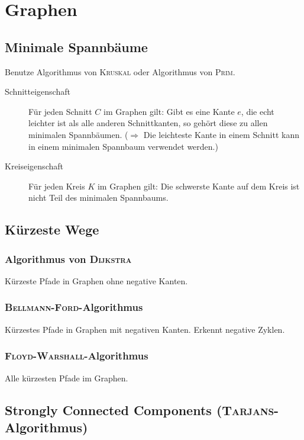 \section{Graphen}

\subsection{Minimale Spannbäume}
Benutze Algorithmus von \textsc{Kruskal} oder Algorithmus von \textsc{Prim}.
\begin{description}
	\item[Schnitteigenschaft] Für jeden Schnitt $C$ im Graphen gilt: Gibt es eine Kante $e$, die echt leichter ist als alle anderen Schnittkanten, so gehört diese zu allen minimalen Spannbäumen. ($\Rightarrow$ Die leichteste Kante in einem Schnitt kann in einem minimalen Spannbaum verwendet werden.)
	\item[Kreiseigenschaft] Für jeden Kreis $K$ im Graphen gilt: Die schwerste Kante auf dem Kreis ist nicht Teil des minimalen Spannbaums.
\end{description}

\subsection{Kürzeste Wege}

\subsubsection{Algorithmus von \textsc{Dijkstra}}
Kürzeste Pfade in Graphen ohne negative Kanten.


\subsubsection{\textsc{Bellmann-Ford}-Algorithmus}
Kürzestes Pfade in Graphen mit negativen Kanten. Erkennt negative Zyklen.


\subsubsection{\textsc{Floyd-Warshall}-Algorithmus}
Alle kürzesten Pfade im Graphen.


\subsection{Strongly Connected Components (\textsc{Tarjans}-Algorithmus)}


